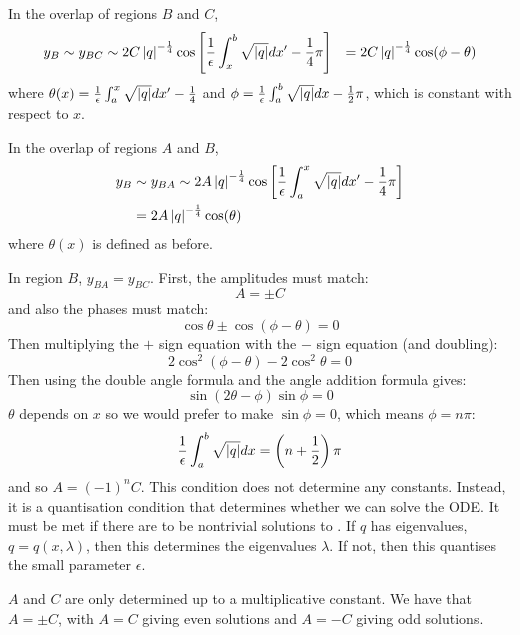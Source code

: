 \documentclass[../Main.tex]{subfiles}
\begin{document}
In the overlap of regions $B$ and $C$,
\begin{align*}
    y_B &\sim y_{BC} \sim 2C \left|q\right|^{-\frac14} \cos\left[\frac1\epsilon \int_x^b \sqrt{\left|q\right|} dx' - \frac14\pi\right]
    &= 2C \left|q\right|^{-\frac14} \cos(\phi - \theta)
\end{align*}
where $\theta(x) = \frac1\epsilon \int_a^x \sqrt{\left|q\right|} dx' - \frac14$ and $\phi = \frac1\epsilon \int_a^b \sqrt{\left|q\right|} dx - \frac12 \pi$, which is constant with respect to $x$.

In the overlap of regions $A$ and $B$,
\begin{align*}
    y_B&\sim y_{BA} \sim 2A\left|q\right|^{-\frac14} \cos\left[\frac1\epsilon \int_a^x \sqrt{\left|q\right|}dx' - \frac14\pi\right] \\
    &= 2A \left|q\right|^{-\frac14} \cos(\theta)
\end{align*}
where $\theta(x)$ is defined as before.

In region $B$, $y_{BA} = y_{BC}$. First, the amplitudes must match:
\begin{equation*}
    A = \pm C
\end{equation*}
and also the phases must match:
\begin{equation*}
    \cos\theta \pm \cos(\phi - \theta) = 0
\end{equation*}
Then multiplying the $+$ sign equation with the $-$ sign equation (and doubling):
\begin{equation*}
    2\cos^2(\phi - \theta) - 2\cos^2 \theta = 0
\end{equation*}
Then using the double angle formula and the angle addition formula gives:
\begin{equation*}
    \sin(2\theta - \phi) \sin\phi = 0
\end{equation*}
$\theta$ depends on $x$ so we would prefer to make $\sin \phi = 0$, which means $\phi = n\pi$:
\begin{equation*}
    \frac1\epsilon \int_a^b \sqrt{\left|q\right|}dx = \left(n + \frac12\right)\pi
\end{equation*}
and so $A = (-1)^n C$. This condition does not determine any constants. Instead, it is a quantisation condition that determines whether we can solve the ODE. It must be met if there are to be nontrivial solutions to . If $q$ has eigenvalues, $q = q(x, \lambda)$, then this determines the eigenvalues $\lambda$. If not, then this quantises the small parameter $\epsilon$.

$A$ and $C$ are only determined up to a multiplicative constant. We have that $A = \pm C$, with $A = C$ giving even solutions and $A = -C$ giving odd solutions.
\end{document}
